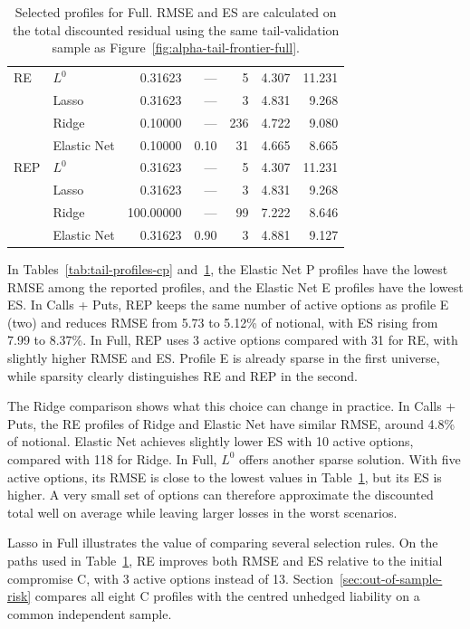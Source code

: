 \documentclass[12pt,a4paper]{article}
\newcommand{\1}{\mathbf{1}}
\begin{document}
\begin{minipage}{\linewidth}
\begin{table}[H]
\begin{tabular}{llrrrrr}
\addlinespace[2pt]
RE & $L^0$ & 0.31623 & --- & 5 & 4.307 & 11.231 \\
 & Lasso & 0.31623 & --- & 3 & 4.831 & 9.268 \\
 & Ridge & 0.10000 & --- & 236 & 4.722 & 9.080 \\
 & Elastic Net & 0.10000 & 0.10 & 31 & 4.665 & 8.665 \\
\addlinespace[2pt]
REP & $L^0$ & 0.31623 & --- & 5 & 4.307 & 11.231 \\
 & Lasso & 0.31623 & --- & 3 & 4.831 & 9.268 \\
 & Ridge & 100.00000 & --- & 99 & 7.222 & 8.646 \\
 & Elastic Net & 0.31623 & 0.90 & 3 & 4.881 & 9.127 \\
\bottomrule
\end{tabular}
\caption{Selected profiles for Full. RMSE and ES are calculated on the total discounted residual using the same tail-validation sample as Figure~\ref{fig:alpha-tail-frontier-full}.}
\label{tab:tail-profiles-full}
\end{table}
\end{minipage}\par

In Tables~\ref{tab:tail-profiles-cp} and~\ref{tab:tail-profiles-full}, the Elastic Net P profiles have the lowest RMSE among the reported profiles, and the Elastic Net E profiles have the lowest ES. In Calls + Puts, REP keeps the same number of active options as profile E (two) and reduces RMSE from 5.73 to 5.12\% of notional, with ES rising from 7.99 to 8.37\%. In Full, REP uses 3 active options compared with 31 for RE, with slightly higher RMSE and ES. Profile E is already sparse in the first universe, while sparsity clearly distinguishes RE and REP in the second.

The Ridge comparison shows what this choice can change in practice. In Calls + Puts, the RE profiles of Ridge and Elastic Net have similar RMSE, around 4.8\% of notional. Elastic Net achieves slightly lower ES with 10 active options, compared with 118 for Ridge. In Full, $L^0$ offers another sparse solution. With five active options, its RMSE is close to the lowest values in Table~\ref{tab:tail-profiles-full}, but its ES is higher. A very small set of options can therefore approximate the discounted total well on average while leaving larger losses in the worst scenarios.

Lasso in Full illustrates the value of comparing several selection rules. On the paths used in Table~\ref{tab:tail-profiles-full}, RE improves both RMSE and ES relative to the initial compromise C, with 3 active options instead of 13. Section~\ref{sec:out-of-sample-risk} compares all eight C profiles with the centred unhedged liability on a common independent sample.
\end{document}
